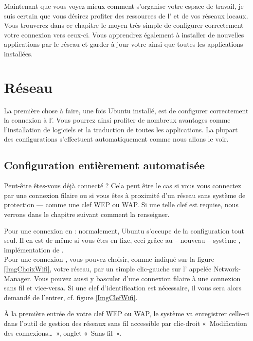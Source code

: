  {Maintenant que vous voyez mieux}{ comment s'organise votre espace de travail, je suis certain que vous désirez profiter des ressources de l' et de vos réseaux locaux. Vous trouverez dans ce chapitre le moyen très simple de configurer correctement votre connexion vers ceux-ci. Vous apprendrez également à installer de nouvelles applications par le réseau et garder à jour votre  ainsi que toutes les applications installées.}
\section{Réseau}
\label{RefInstallReseau}
La première chose à faire, une fois Ubuntu installé, est de configurer correctement la connexion à l'. Vous pourrez ainsi profiter de nombreux avantages comme l'installation de logiciels et la traduction de toutes les applications. La plupart des configurations s'effectuent automatiquement comme nous allons le voir.
\subsection{Configuration entièrement automatisée}
\label{RefUtilisationNM}
Peut-être êtes-vous déjà connecté ? Cela peut être le cas si vous vous connectez par une connexion filaire ou si vous êtes à proximité d'un réseau  sans système de protection --- comme une clef WEP ou WAP. Si une telle clef est requise, nous verrons dans le chapitre suivant comment la renseigner.\par
Pour une connexion  en  : normalement, Ubuntu s'occupe de la configuration tout seul. Il en est de même si vous êtes en  fixe, ceci grâce au -- nouveau -- système , implémentation de .\\
Pour une connexion , vous pouvez choisir, comme indiqué sur la figure \ref{ImgChoixWifi}, votre réseau, par un simple clic-gauche sur l' appelée Network-Manager. Vous pouvez aussi y basculer d'une connexion filaire à une connexion sans fil et vice-versa. Si une clef d'identification est nécessaire, il vous sera alors demandé de l'entrer, cf. figure \ref{ImgClefWifi}.\par
\ReseauNM
À la première entrée de votre clef WEP ou WAP, le système va enregistrer celle-ci dans l'outil de gestion des réseaux sans fil accessible par clic-droit «~Modification des connexions\ldots{}~», onglet «~Sans fil~».\par

